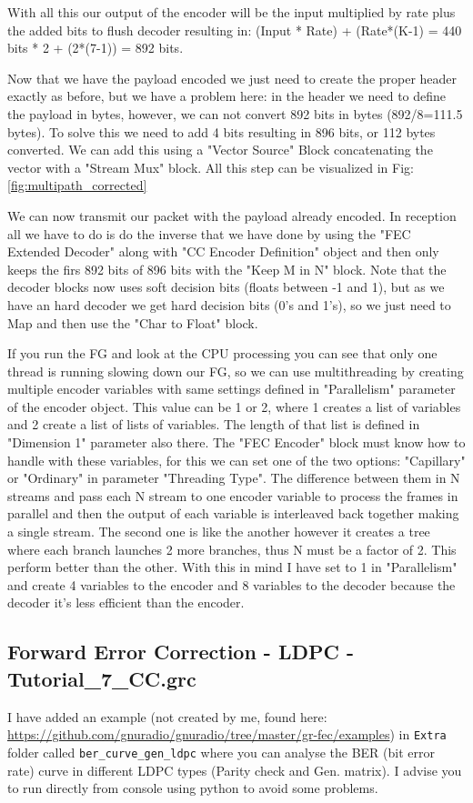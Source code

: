 \documentclass[a4paper, 10pt, conference]{ieeeconf}      %
\begin{document}
    With all this our output of the encoder will be the input multiplied by rate plus the added bits to flush decoder resulting in: (Input * Rate) + (Rate*(K-1) = 440 bits * 2 + (2*(7-1)) = 892 bits.
    
    Now that we have the payload encoded we just need to create the proper header exactly as before, but we have a problem here: in the header we need to define the payload in bytes, however, we can not convert 892 bits in bytes (892/8=111.5 bytes). To solve this we need to add 4 bits resulting in 896 bits, or 112 bytes converted. We can add this using a "Vector Source" Block concatenating the vector with a "Stream Mux" block. All this step can be visualized in Fig: \ref{fig:multipath_corrected}
    
    We can now transmit our packet with the payload already encoded. In reception all we have to do is do the inverse that we have done by using the "FEC Extended Decoder" along with "CC Encoder Definition" object and then only keeps the firs 892 bits of 896 bits with the  "Keep M in N" block. Note that the decoder blocks now uses soft decision bits (floats between -1 and 1), but as we have an hard decoder we get hard decision bits (0's and 1's), so we just need to Map and  then use the "Char to Float" block.
    
    If you run the FG and look at the CPU processing you can see that only one thread is running slowing down our FG, so we can use multithreading by creating multiple encoder variables with same settings defined in "Parallelism" parameter of the encoder object. This value can be 1 or 2, where 1 creates a list of variables and 2 create a list of lists of variables. The length of that list is defined in "Dimension 1" parameter also there. The "FEC Encoder" block must know how to handle with these variables, for this we can set one of the two options: "Capillary" or "Ordinary" in parameter "Threading Type". The difference between them in N streams and pass each N stream to one encoder variable to process the frames in parallel and then the output of each variable is interleaved back together making a single stream. The second one is like the another however it creates a tree where each branch launches 2 more branches, thus N must be a factor of 2. This perform better than the other. With this in mind I have set to 1 in "Parallelism" and create 4 variables to the encoder and 8 variables to the decoder because the decoder it's less efficient than the encoder.
    

\subsection{Forward Error Correction - LDPC - Tutorial\_7\_CC.grc}
    I have added an example (not created by me, found here: \url{https://github.com/gnuradio/gnuradio/tree/master/gr-fec/examples}) in \verb|Extra| folder called \verb|ber_curve_gen_ldpc| where you can analyse the BER (bit error rate) curve in different LDPC types (Parity check and Gen. matrix). I advise you to run directly from console using python to avoid some problems.
\end{document}
